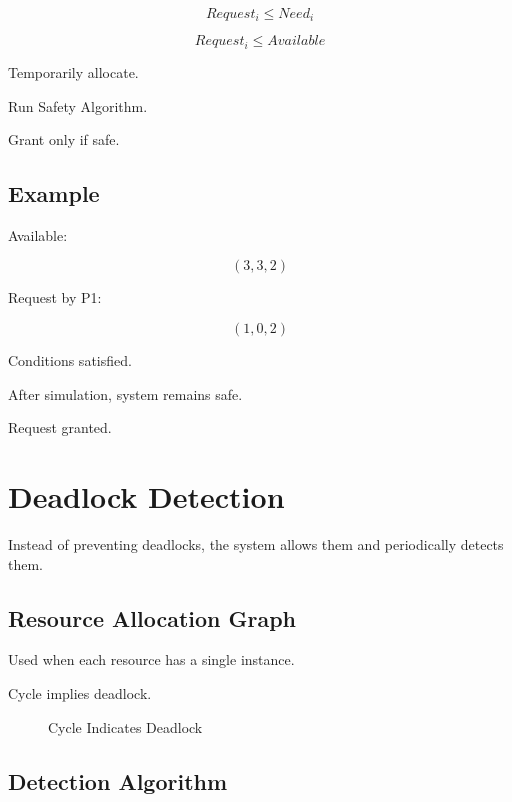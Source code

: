 \[
Request_i \leq Need_i
\]

\[
Request_i \leq Available
\]

Temporarily allocate.

Run Safety Algorithm.

Grant only if safe.

\subsection{Example}

Available:

\[
(3,3,2)
\]

Request by P1:

\[
(1,0,2)
\]

Conditions satisfied.

After simulation, system remains safe.

Request granted.

\section{Deadlock Detection}

Instead of preventing deadlocks, the system allows them and periodically detects them.

\subsection{Resource Allocation Graph}

Used when each resource has a single instance.

Cycle implies deadlock.

\begin{figure}[H]
\centering
{}
\caption{Cycle Indicates Deadlock}
\end{figure}

\subsection{Detection Algorithm}


